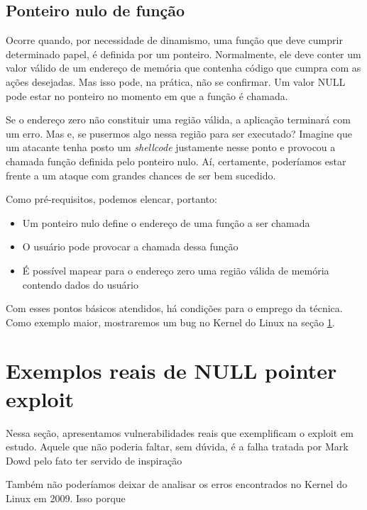 			
		\subsection{Ponteiro nulo de função}
			Ocorre quando, por necessidade de dinamismo, uma função que deve cumprir determinado
			papel, é definida por um ponteiro. Normalmente, ele deve conter um valor válido
			de um endereço de memória que contenha código que cumpra com as ações desejadas.
			Mas isso pode, na prática, não se confirmar. Um valor NULL pode estar no ponteiro
			no momento em que a função é chamada.

			
			Se o endereço zero não constituir uma região válida, a aplicação terminará com um erro.
			Mas e, se pusermos algo nessa região para ser executado? Imagine que um atacante tenha
			posto um \textsl{shellcode} justamente nesse ponto e provocou a chamada função definida pelo
			ponteiro nulo. Aí, certamente, poderíamos estar frente a um ataque com grandes chances de
			ser bem sucedido.
			

			Como pré-requisitos, podemos elencar, portanto:
			\begin{itemize}
				\item{Um ponteiro nulo define o endereço de uma função a ser chamada}
				\item{O usuário pode provocar a chamada dessa função}
				\item{É possível mapear para o endereço zero uma região válida de memória contendo dados do usuário}
			\end{itemize}
			Com esses pontos básicos atendidos, há condições para o emprego da técnica.
			Como exemplo maior, mostraremos um bug no Kernel do Linux na seção \ref{sec:exemplos_null_pointer}. 


	\section{Exemplos reais de NULL pointer exploit}
	\label{sec:exemplos_null_pointer}

		Nessa seção, apresentamos vulnerabilidades reais que exemplificam o exploit em estudo.
		Aquele que não poderia faltar, sem dúvida, é a falha tratada por Mark Dowd pelo fato
		ter servido de inspiração


		Também não poderíamos deixar de analisar os erros encontrados no Kernel do Linux em 2009.
		Isso porque 
			

